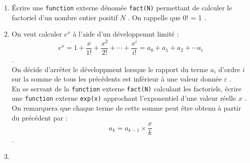 \documentclass[a4paper, 11pt]{report}
\begin{document}
\begin{enumerate}
  \item Écrire une \verb|function| externe dénomée \verb|fact(N)| permettant de calculer le factoriel d'un nombre entier positif $N$ . On rappelle que 0! = 1 .
  \item On veut calculer $e^x$ à l'aide d'un développemnt limité : 
    $$ e^x = 1 + \frac{x}{1!} + \frac{x^2}{2!} + \cdots + \frac{x^i}{i!} = a_0 + a_1 + a_2 + \cdots a_i $$ . \\
    On décide d'arrêter le développment lorsque le rapport du terme $a_i$ d'ordre $i$ sur la somme de tous les précédents est inférieur à une valeur donnée $\varepsilon $ . \\ 
    
    \vspace{0,125 cm}
    \noindent
    En se servant de la \verb|function| externe \verb|fact(N)| calculant les factoriels, écrire une \verb|function| externe \verb|exp(x)| approchant l'exponentiel d'une valeur réelle $x$ . \\
    On remarquera que chaque terme de cette somme peut être obtenu à partir du précédent par :
    $$ a_k = a_{k - 1} \times \frac{x}{k} $$ . 
  \item   
\end{enumerate}
\end{document}
